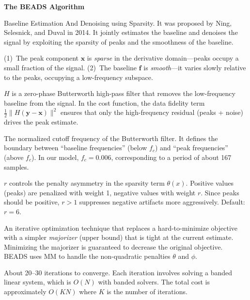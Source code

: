 \documentclass[11pt, letterpaper]{article}
\begin{document}
\vspace{0.8em}
{\large\bfseries\sffamily\color{SectionBlue} The BEADS Algorithm}\par\vspace{0.2em}

{Baseline Estimation And Denoising using Sparsity.  It was proposed by Ning, Selesnick, and Duval in 2014.  It jointly estimates the baseline and denoises the signal by exploiting the sparsity of peaks and the smoothness of the baseline.}

{(1)~The peak component $\mathbf{x}$ is \emph{sparse} in the derivative domain---peaks occupy a small fraction of the signal.  (2)~The baseline $\mathbf{f}$ is \emph{smooth}---it varies slowly relative to the peaks, occupying a low-frequency subspace.}

{$H$ is a zero-phase Butterworth high-pass filter that removes the low-frequency baseline from the signal.  In the cost function, the data fidelity term $\frac{1}{2}\|H(\mathbf{y} - \mathbf{x})\|^2$ ensures that only the high-frequency residual (peaks + noise) drives the peak estimate.}

{The normalized cutoff frequency of the Butterworth filter.  It defines the boundary between ``baseline frequencies'' (below $f_c$) and ``peak frequencies'' (above $f_c$).  In our model, $f_c = 0.006$, corresponding to a period of about 167 samples.}

{$r$ controls the penalty asymmetry in the sparsity term $\theta(x)$.  Positive values (peaks) are penalized with weight 1, negative values with weight $r$.  Since peaks should be positive, $r > 1$ suppresses negative artifacts more aggressively.  Default: $r = 6$.}

{An iterative optimization technique that replaces a hard-to-minimize objective with a simpler \emph{majorizer} (upper bound) that is tight at the current estimate.  Minimizing the majorizer is guaranteed to decrease the original objective.  BEADS uses MM to handle the non-quadratic penalties $\theta$ and $\phi$.}

{About 20--30 iterations to converge.  Each iteration involves solving a banded linear system, which is $O(N)$ with banded solvers.  The total cost is approximately $O(KN)$ where $K$ is the number of iterations.}
\end{document}
